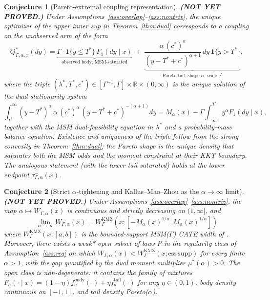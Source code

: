\documentclass[11pt]{article}
\newcommand{\one}{\mathbf{1}}
\newcommand{\R}{\mathbb{R}}
\theoremstyle{definition}
\theoremstyle{plain}
\newtheorem{conjecture}{Conjecture}
\theoremstyle{remark}
\begin{document}
\begin{conjecture}[Pareto-extremal coupling representation]\label{conj:pareto}\textbf{(NOT YET PROVED.)}
Under Assumptions~\ref{ass:overlap}--\ref{ass:nontriv}, the unique optimizer of the upper inner sup in Theorem~\ref{thm:dual} corresponds to a coupling on the unobserved arm of the form
\[
  Q^\ast_{\Gamma,\alpha,x}(dy)
  = \underbrace{\Gamma \cdot \one\{y\le T^\ast\}\, F_1(dy\mid x)}_{\text{observed body, MSM-saturated}}
  \;+\; \underbrace{\frac{\alpha\, (c^\ast)^{\alpha}}{(y - T^\ast + c^\ast)^{\alpha+1}}\, dy\, \one\{y>T^\ast\}}_{\text{Pareto tail, shape }\alpha,\,\text{scale }c^\ast},
\]
where the triple $(\lambda^\ast, T^\ast, c^\ast) \in [\Gamma^{-1},\Gamma]\times\R\times(0,\infty)$ is the unique solution of the dual stationarity system
\[
  \int_{T^\ast}^\infty (y - T^\ast)^{\alpha}\, \alpha\, (c^\ast)^\alpha\, (y-T^\ast+c^\ast)^{-(\alpha+1)} dy = M_\alpha(x) - \Gamma \int_{-\infty}^{T^\ast} y^\alpha F_1(dy\mid x),
\]
together with the MSM dual-feasibility equation in $\lambda^\ast$ and a probability-mass balance equation. Existence and uniqueness of the triple follow from the strong convexity in Theorem~\ref{thm:dual}; the Pareto shape is the unique density that saturates both the MSM odds and the moment constraint at their KKT boundary. The analogous statement (with the lower tail saturated) holds at the lower endpoint $\tau^-_{\Gamma,\alpha}(x)$.
\end{conjecture}

\begin{conjecture}[Strict $\alpha$-tightening and Kallus--Mao--Zhou as the $\alpha\to\infty$ limit]\label{conj:strict-tight}\textbf{(NOT YET PROVED.)}
Under Assumptions~\ref{ass:overlap}--\ref{ass:nontriv}, the map $\alpha\mapsto W_{\Gamma,\alpha}(x)$ is continuous and strictly decreasing on $(1,\infty]$, and
\[
  \lim_{\alpha\to\infty} W_{\Gamma,\alpha}(x) = W^{\mathrm{KMZ}}_{\Gamma}(x; [-M_\alpha(x)^{1/\alpha}, M_\alpha(x)^{1/\alpha}])
\]
where $W^{\mathrm{KMZ}}_\Gamma(x; [a,b])$ is the bounded-support MSM($\Gamma$) CATE width of \cite{KallusMaoZhou2019CATEIntervals}. Moreover, there exists a weak*-open subset of laws $P$ in the regularity class of Assumption~\ref{ass:reg} on which $W_{\Gamma,\alpha}(x) < W^{\mathrm{KMZ}}_\Gamma(x;\mathrm{ess\,supp})$ for every finite $\alpha>1$, with the gap quantified by the dual moment multiplier $\mu^\ast(\alpha) > 0$. The open class is non-degenerate: it contains the family of mixtures $F_a(\cdot\mid x) = (1-\eta) f_a^{\mathrm{body}}(\cdot) + \eta f_a^{\mathrm{tail}}(\cdot)$ for any $\eta\in(0,1)$, body density continuous on $[-1,1]$, and tail density Pareto($\alpha$).
\end{conjecture}
\end{document}
